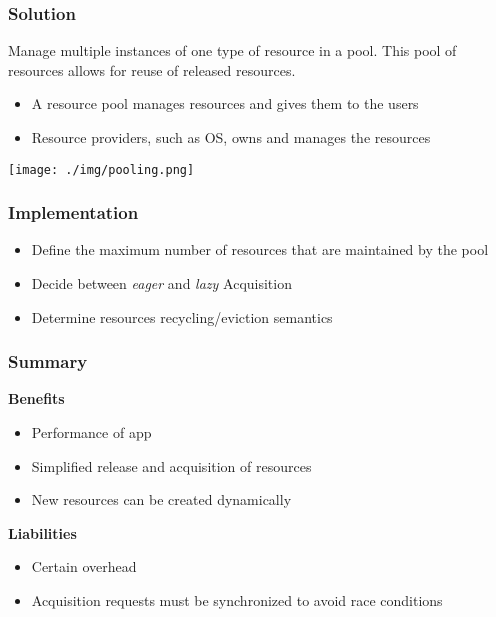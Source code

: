 \subsubsection{Solution}
Manage multiple instances of one type of resource in a pool. This pool of resources allows for reuse of released resources.
\begin{itemize}
    \item A resource pool manages resources and gives them to the users
    \item Resource providers, such as OS, owns and manages the resources
\end{itemize}
\texttt{[image: ./img/pooling.png]}
\subsubsection{Implementation}
\begin{itemize}
    \item Define the maximum number of resources that are maintained by the pool
    \item Decide between \textit{eager} and \textit{lazy} Acquisition
    \item Determine resources recycling/eviction semantics
\end{itemize}
\subsubsection{Summary}
\textbf{Benefits}
\begin{itemize}
    \item Performance of app
    \item Simplified release and acquisition of resources
    \item New resources can be created dynamically
\end{itemize}
\textbf{Liabilities}
\begin{itemize}
    \item Certain overhead
    \item Acquisition requests must be synchronized to avoid race conditions
\end{itemize}

